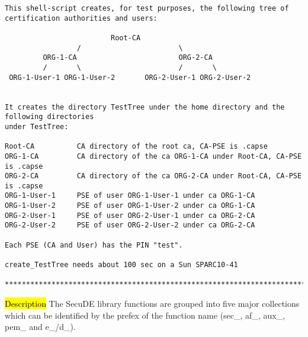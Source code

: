 {\begin{verbatim}
This shell-script creates, for test purposes, the following tree of 
certification authorities and users: 
 
                         Root-CA 
                 /                       \ 
         ORG-1-CA                        ORG-2-CA 
         /       \                       /       \ 
 ORG-1-User-1 ORG-1-User-2       ORG-2-User-1 ORG-2-User-2 
 
 
It creates the directory TestTree under the home directory and the following directories 
under TestTree: 
 
Root-CA          CA directory of the root ca, CA-PSE is .capse
ORG-1-CA         CA directory of the ca ORG-1-CA under Root-CA, CA-PSE is .capse
ORG-2-CA         CA directory of the ca ORG-2-CA under Root-CA, CA-PSE is .capse
ORG-1-User-1     PSE of user ORG-1-User-1 under ca ORG-1-CA
ORG-1-User-2     PSE of user ORG-1-User-2 under ca ORG-1-CA
ORG-2-User-1     PSE of user ORG-2-User-1 under ca ORG-2-CA
ORG-2-User-2     PSE of user ORG-2-User-2 under ca ORG-2-CA

Each PSE (CA and User) has the PIN "test".
 
create_TestTree needs about 100 sec on a Sun SPARC10-41

****************************************************************************************
\end{verbatim}
}

\label{intro3}
\hl{Description}
The SecuDE library functions are grouped into five major collections which 
can be identified by the prefex of the function name (sec\_, af\_,
aux\_, pem\_ and e\_/d\_).

